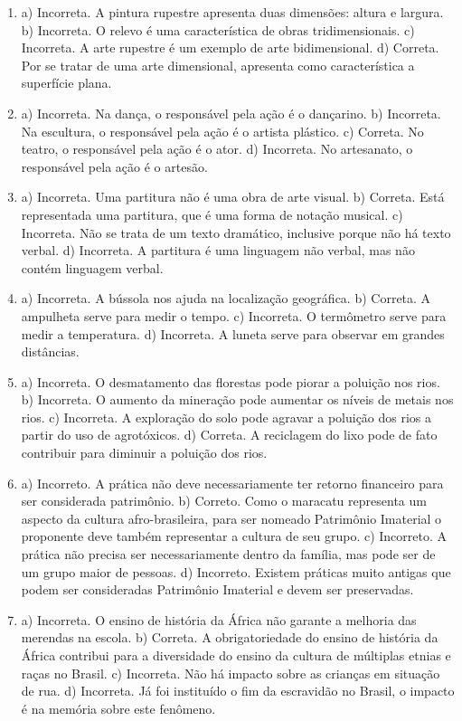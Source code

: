 \begin{enumerate}
\item
a)  Incorreta. A pintura rupestre apresenta duas dimensões: altura e largura.
b)  Incorreta. O relevo é uma característica de obras tridimensionais.
c)  Incorreta. A arte rupestre é um exemplo de arte bidimensional.
d)  Correta. Por se tratar de uma arte dimensional, apresenta como
  característica a superfície plana.

\item
a)  Incorreta. Na dança, o responsável pela ação é o dançarino.
b)  Incorreta. Na escultura, o responsável pela ação é o artista plástico.
c)  Correta. No teatro, o responsável pela ação é o ator.
d)  Incorreta. No artesanato, o responsável pela ação é o artesão.

\item
a) Incorreta. Uma partitura não é uma obra de arte visual.
b) Correta. Está representada uma partitura, que é uma forma de notação musical.
c) Incorreta. Não se trata de um texto dramático, inclusive porque não há texto verbal.
d) Incorreta. A partitura é uma linguagem não verbal, mas não contém linguagem verbal.

\item
a) Incorreta. A bússola nos ajuda na localização geográfica.
b) Correta. A ampulheta serve para medir o tempo.
c) Incorreta. O termômetro serve para medir a temperatura.
d) Incorreta. A luneta serve para observar em grandes distâncias.

\item
a) Incorreta. O desmatamento das florestas pode piorar a poluição nos
rios.
b) Incorreta. O aumento da mineração pode aumentar os níveis de metais
nos rios.
c) Incorreta. A exploração do solo pode agravar a poluição dos rios a
partir do uso de agrotóxicos.
d) Correta. A reciclagem do lixo pode de fato contribuir para diminuir a
poluição dos rios.

\item
a) Incorreto. A prática não deve necessariamente ter retorno financeiro
para ser considerada patrimônio.
b) Correto. Como o maracatu representa um aspecto da cultura
afro-brasileira, para ser nomeado Patrimônio Imaterial o proponente deve
também representar a cultura de seu grupo.
c) Incorreto. A prática não precisa ser necessariamente dentro da
família, mas pode ser de um grupo maior de pessoas.
d) Incorreto. Existem práticas muito antigas que podem ser consideradas
Patrimônio Imaterial e devem ser preservadas.

\item
a) Incorreta. O ensino de história da África não garante a melhoria das
merendas na escola.
b) Correta. A obrigatoriedade do ensino de história da África contribui
para a diversidade do ensino da cultura de múltiplas etnias e raças no
Brasil.
c) Incorreta. Não há impacto sobre as crianças em situação de rua.
d) Incorreta. Já foi instituído o fim da escravidão no Brasil, o impacto
é na memória sobre este fenômeno.


\end{enumerate}

